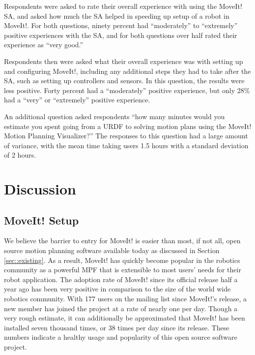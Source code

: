 \documentclass[10pt,journal,compsoc]{joser1}
\begin{document}
{Respondents were asked to rate their overall experience with using the MoveIt!
SA, and asked how much the SA helped in speeding up setup of a robot in MoveIt!.
For both questions, ninety percent had ``moderately'' to ``extremely'' positive
experiences with the SA, and for both questions over half rated their experience
as ``very good.''

Respondents then were asked what their overall experience was with setting up
and configuring MoveIt!, including any additional steps they had to take after
the SA, such as setting up controllers and sensors. In this question, the
results were less positive. Forty percent had a ``moderately'' positive
experience, but only 28\% had a ``very'' or ``extremely'' positive experience. 

An additional question asked respondents ``how many minutes would you estimate
you spent going from a URDF to solving motion plans using the MoveIt! Motion
Planning Visualizer?'' The responses to this question had a large amount of
variance, with the mean time taking users 1.5 hours with a standard deviation of
2 hours.



\section{Discussion}
\label{sec::discussion}

\subsection{MoveIt! Setup}
\label{sec::moveit_discussion}

We believe the barrier to entry for MoveIt! is easier than most, if not all,
open source motion planning software available today as discussed in Section
\ref{sec::existing}. As a result, MoveIt! has quickly become popular in the
robotics community as a powerful MPF that is extensible to most users' needs for
their robot application. The adoption rate of MoveIt! since its official release
half a year ago has been very positive in comparison to the size of the world
wide robotics community. With 177 users on the mailing list since MoveIt!'s
release, a new member has joined the project at a rate of nearly one per day.
Though a very rough estimate, it can additionally be approximated that MoveIt!
has been installed seven thousand times, or 38 times per day since its release.
These numbers indicate a healthy usage and popularity of this open source
software project.

}
\end{document}
